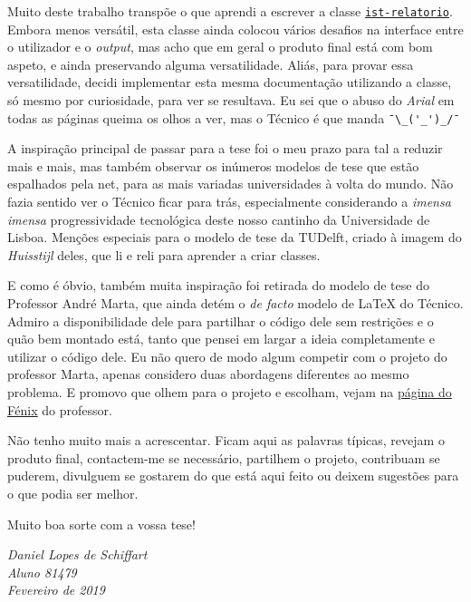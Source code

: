 \documentclass{../ist-thesis}
\begin{document}
Muito deste trabalho transpõe o que aprendi a escrever a classe \href{https://github.com/ekspek/ist-relatorio}{\texttt{ist-relatorio}}. Embora menos versátil, esta classe ainda colocou vários desafios na interface entre o utilizador e o \textit{output}, mas acho que em geral o produto final está com bom aspeto, e ainda preservando alguma versatilidade. Aliás, para provar essa versatilidade, decidi implementar esta mesma documentação utilizando a classe, só mesmo por curiosidade, para ver se resultava. Eu sei que o abuso do \textit{Arial} em todas as páginas queima os olhos a ver, mas o Técnico é que manda \verb|¯\_('_')_/¯|

A inspiração principal de passar para a tese foi o meu prazo para tal a reduzir mais e mais, mas também observar os inúmeros modelos de tese que estão espalhados pela net, para as mais variadas universidades à volta do mundo. Não fazia sentido ver o Técnico ficar para trás, especialmente considerando a \textit{imensa imensa} progressividade tecnológica deste nosso cantinho da Universidade de Lisboa. Menções especiais para o modelo de tese da TUDelft, criado à imagem do \textit{Huisstijl} deles, que li e reli para aprender a criar classes.

E como é óbvio, também muita inspiração foi retirada do modelo de tese do Professor André Marta, que ainda detém o \textit{de facto} modelo de \LaTeX{} do Técnico. Admiro a disponibilidade dele para partilhar o código dele sem restrições e o quão bem montado está, tanto que pensei em largar a ideia completamente e utilizar o código dele. Eu não quero de modo algum competir com o projeto do professor Marta, apenas considero duas abordagens diferentes ao mesmo problema. E promovo que olhem para o projeto e escolham, vejam na \href{https://fenix.tecnico.ulisboa.pt/homepage/ist31052/documentos-para-elaboracao-da-tese}{página do Fénix} do professor.

Não tenho muito mais a acrescentar. Ficam aqui as palavras típicas, revejam o produto final, contactem-me se necessário, partilhem o projeto, contribuam se puderem, divulguem se gostarem do que está aqui feito ou deixem sugestões para o que podia ser melhor.

Muito boa sorte com a vossa tese!

\begin{flushright}\itshape
	Daniel Lopes de Schiffart \\
	Aluno 81479 \\
	Fevereiro de 2019
\end{flushright}
\end{document}

